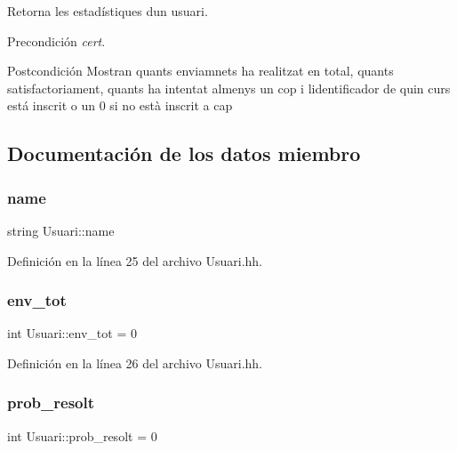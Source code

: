 Retorna les estadístiques d\textquotesingle{}un usuari. 

\begin{DoxyPrecond}{Precondición}
{\itshape cert}. 
\end{DoxyPrecond}
\begin{DoxyPostcond}{Postcondición}
Mostran quants enviamnets ha realitzat en total, quants satisfactoriament, quants ha intentat almenys un cop i l\textquotesingle{}identificador de quin curs está inscrit o un 0 si no està inscrit a cap 
\end{DoxyPostcond}


\subsection{Documentación de los datos miembro}
\mbox{\label{class_usuari_a0b513dec3aba1eefd51e55c98d3911b8}} 
\subsubsection{\texorpdfstring{name}{name}}
{\footnotesize\ttfamily string Usuari\+::name}



Definición en la línea 25 del archivo Usuari.\+hh.

\mbox{\label{class_usuari_a3b7696f2acca6fb4741dff21f2c778b3}} 
\subsubsection{\texorpdfstring{env\+\_\+tot}{env\_tot}}
{\footnotesize\ttfamily int Usuari\+::env\+\_\+tot = 0}



Definición en la línea 26 del archivo Usuari.\+hh.

\mbox{\label{class_usuari_aebde05f0dd98594c9d7cd01671d82541}} 
\subsubsection{\texorpdfstring{prob\+\_\+resolt}{prob\_resolt}}
{\footnotesize\ttfamily int Usuari\+::prob\+\_\+resolt = 0}



